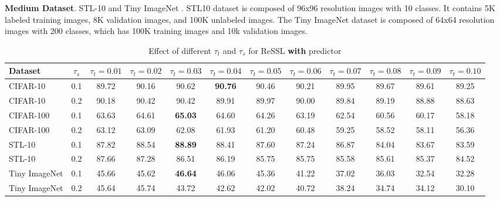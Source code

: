 \documentclass{article}
\newcommand{\<}{\left\langle}
\renewcommand{\>}{\right\rangle}
\begin{document}
\textbf{Medium Dataset}.
STL-10 \cite{stl10} and Tiny ImageNet \cite{tinyImagenet}. STL10 \cite{stl10} dataset is composed of 96x96 resolution images with 10 classes. It contains 5K labeled training images, 8K validation images, and 100K unlabeled images. The Tiny ImageNet dataset is composed of 64x64 resolution images with 200 classes, which has 100K training images and 10k validation images.





\renewcommand\arraystretch{1.0}
\begin{table*}[h]
 \centering
 \setlength\tabcolsep{3pt}
 \caption{Effect of different $\tau_t$ and $\tau_s$ for ReSSL \textbf{with} predictor}
 \vspace{-10pt}
 \label{table:ablation_t_pred}
\begin{tabular}{l c c c c c c c c c c c} 
\toprule 
Dataset        & $\tau_s$ & $\tau_t = 0.01$ & $\tau_t = 0.02$ & $\tau_t = 0.03$ & $\tau_t = 0.04$ & $\tau_t = 0.05$ & $\tau_t = 0.06$ & $\tau_t = 0.07$ & $\tau_t = 0.08$  & $\tau_t = 0.09$  & $\tau_t = 0.10$ \\  \hline
CIFAR-10       & 0.1 & 89.72  & 90.16 & 90.62 & \textbf{90.76}  & 90.46 & 90.21 & 89.95 & 89.67 & 89.61 & 89.25 \\
CIFAR-10       & 0.2 & 90.18  & 90.42 & 90.42 & 89.91 & 89.97 & 90.00 & 89.84 & 89.19 & 88.88 & 88.63 \\ \hline
CIFAR-100      & 0.1 & 63.63  & 64.61 & \textbf{65.03} & 64.60 & 64.26 & 63.19 & 62.54 & 60.56 & 60.17 & 58.18 \\
CIFAR-100      & 0.2 & 63.12  & 63.09 & 62.08 & 61.93 & 61.20 & 60.48 & 59.25 & 58.52 & 58.11 & 56.36 \\ \hline
STL-10         & 0.1 & 87.82  & 88.54 & \textbf{88.89} & 88.41 & 87.60 & 87.24 & 86.87 & 84.04 & 83.67 & 83.59 \\
STL-10         & 0.2 & 87.66  & 87.28 & 86.51 & 86.19 & 85.75 & 85.75 & 85.58 & 85.61 & 85.37 & 84.52 \\ \hline
Tiny ImageNet  & 0.1 & 45.66  & 45.62 & \textbf{46.64} & 46.06 & 45.36 & 41.22 & 37.02 & 36.03 & 32.54 & 32.28 \\
Tiny ImageNet  & 0.2 & 45.64  & 45.74 & 43.72 & 42.62 & 42.02 & 40.72 & 38.24 & 34.74 & 34.12 & 30.10 \\
\bottomrule 
\end{tabular}
\vspace{-10pt}
\end{table*}
\end{document}
